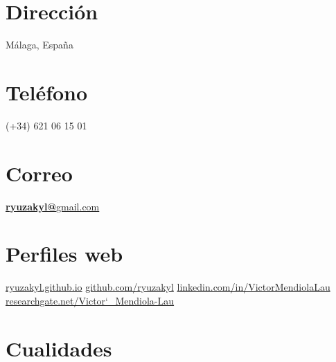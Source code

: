 \documentclass[]{friggeri-cv}
\begin{document}


\begin{aside}
  \section{Dirección}
    Málaga, España
    ~
    ~
    ~
  \section{Teléfono}
    (+34) 621 06 15 01
    ~
    ~
    ~
  \section{Correo}
    \href{mailto:ryuzakyl@gmail.com}{\textbf{ryuzakyl@}gmail.com}
	~
	~    
    ~
  \section{Perfiles web}
    \href{https://ryuzakyl.github.io}{{\scriptsize ryuzakyl.github.io}}
    \href{https://github.com/ryuzakyl}{{\scriptsize github.com/ryuzakyl}}
    \href{https://www.linkedin.com/in/victormendiolalau}{{\scriptsize linkedin.com/in/VictorMendiolaLau}}
	\href{https://www.researchgate.net/profile/Victor_Mendiola-Lau}{{\scriptsize researchgate.net/Victor\char`_Mendiola-Lau}}
    ~
    ~
    ~
  \section{Cualidades}
    ~
\end{aside}
\end{document}
